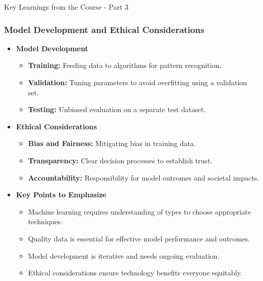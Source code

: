 \documentclass[aspectratio=169]{beamer}
\begin{document}
\begin{frame}[fragile]{Key Learnings from the Course - Part 3}
    \frametitle{Model Development and Ethical Considerations}
    \begin{itemize}
        \item \textbf{Model Development}
        \begin{itemize}
            \item \textbf{Training:} Feeding data to algorithms for pattern recognition.
            \item \textbf{Validation:} Tuning parameters to avoid overfitting using a validation set.
            \item \textbf{Testing:} Unbiased evaluation on a separate test dataset.
        \end{itemize}
        
        \item \textbf{Ethical Considerations}
        \begin{itemize}
            \item \textbf{Bias and Fairness:} Mitigating bias in training data.
            \item \textbf{Transparency:} Clear decision processes to establish trust.
            \item \textbf{Accountability:} Responsibility for model outcomes and societal impacts.
        \end{itemize}
        
        \item \textbf{Key Points to Emphasize}
        \begin{itemize}
            \item Machine learning requires understanding of types to choose appropriate techniques.
            \item Quality data is essential for effective model performance and outcomes.
            \item Model development is iterative and needs ongoing evaluation.
            \item Ethical considerations ensure technology benefits everyone equitably.
        \end{itemize}
    \end{itemize}
\end{frame}
\end{document}
